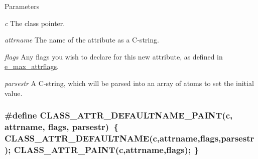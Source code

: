 \begin{DoxyParams}{Parameters}
\item[{\em c}]The class pointer. \item[{\em attrname}]The name of the attribute as a C-\/string. \item[{\em flags}]Any flags you wish to declare for this new attribute, as defined in \hyperlink{group__attr_gaf296cfc6741bb19207f6ed8062809115}{e\_\-max\_\-attrflags}. \item[{\em parsestr}]A C-\/string, which will be parsed into an array of atoms to set the initial value. \end{DoxyParams}
\hypertarget{group__attr_ga4bb21babfd8b2152c9ab9bcc511e0756}{
\subsubsection[{CLASS\_\-ATTR\_\-DEFAULTNAME\_\-PAINT}]{\setlength{\rightskip}{0pt plus 5cm}\#define CLASS\_\-ATTR\_\-DEFAULTNAME\_\-PAINT(c, \/  attrname, \/  flags, \/  parsestr)~\{ CLASS\_\-ATTR\_\-DEFAULTNAME(c,attrname,flags,parsestr); CLASS\_\-ATTR\_\-PAINT(c,attrname,flags); \}}}
\label{group__attr_ga4bb21babfd8b2152c9ab9bcc511e0756}


